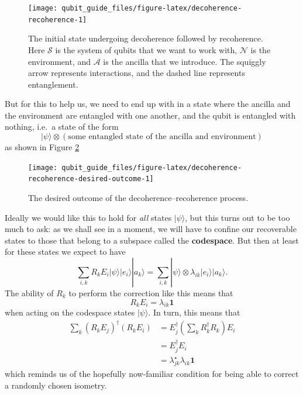 \documentclass[fleqn,a4paper]{article}
\theoremstyle{definition}
\theoremstyle{definition}
\theoremstyle{definition}
\theoremstyle{definition}
\theoremstyle{remark}
\begin{document}
\begin{figure}[H]

{\centering \texttt{[image: qubit\_guide\_files/figure-latex/decoherence-recoherence-1]} 

}

\caption{The initial state undergoing decoherence followed by recoherence. Here \(\mathcal{S}\) is the system of qubits that we want to work with, \(\mathcal{N}\) is the environment, and \(\mathcal{A}\) is the ancilla that we introduce. The squiggly arrow represents interactions, and the dashed line represents entanglement.}\label{fig:decoherence-recoherence}
\end{figure}

But for this to help us, we need to end up with in a state where the ancilla and the environment are entangled with one another, and the qubit is entangled with nothing, i.e.~a state of the form
\[
  |\psi\rangle\otimes(\text{some entangled state of the ancilla and environment})
\]
as shown in Figure \ref{fig:decoherence-recoherence-desired-outcome}



\begin{figure}[H]

{\centering \texttt{[image: qubit\_guide\_files/figure-latex/decoherence-recoherence-desired-outcome-1]} 

}

\caption{The desired outcome of the decoherence--recoherence process.}\label{fig:decoherence-recoherence-desired-outcome}
\end{figure}

Ideally we would like this to hold for \emph{all} states \(|\psi\rangle\), but this turns out to be too much to ask: as we shall see in a moment, we will have to confine our recoverable states to those that belong to a subspace called the \textbf{codespace}.
But then at least for these states we expect to have
\[
  \sum_{i,k} R_kE_i |\psi\rangle|e_i\rangle|a_k\rangle
  = \sum_{i,k} |\psi\rangle\otimes\lambda_{ik}|e_i\rangle|a_k\rangle.
\]
The ability of \(R_k\) to perform the correction like this means that
\[
  R_kE_i
  = \lambda_{ik}\mathbf{1}
\]
when acting on the codespace states \(|\psi\rangle\).
In turn, this means that
\[
  \begin{aligned}
    \sum_k (R_k E_j)^\dagger(R_k E_i)
    &= E_j^\dagger \left(\sum_k R_k^\dagger R_k\right) E_i
  \\&= E_j^\dagger E_i
  \\&= \lambda_{jk}^\star\lambda_{ik}\mathbf{1}
  \end{aligned}
\]
which reminds us of the hopefully now-familiar condition for being able to correct a randomly chosen isometry.
\end{document}
